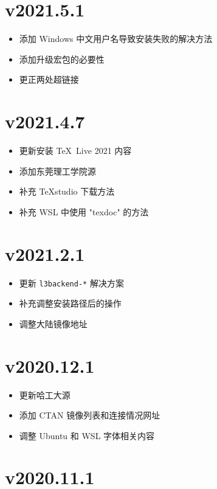 \section*{v2021.5.1}

\begin{itemize}
  \item 添加 Windows 中文用户名导致安装失败的解决方法
  \item 添加升级宏包的必要性
  \item 更正两处超链接
\end{itemize}

\section*{v2021.4.7}

\begin{itemize}
  \item 更新安装 \TeX~Live 2021 内容
  \item 添加东莞理工学院源
  \item 补充 \TeX studio 下载方法
  \item 补充 WSL 中使用 "texdoc" 的方法
\end{itemize}

\section*{v2021.2.1}

\begin{itemize}
  \item 更新 \texttt{l3backend-*} 解决方案
  \item 补充调整安装路径后的操作
  \item 调整大陆镜像地址
\end{itemize}
\section*{v2020.12.1}

\begin{itemize}
  \item 更新哈工大源
  \item 添加 CTAN 镜像列表和连接情况网址
  \item 调整 Ubuntu 和 WSL 字体相关内容
\end{itemize}

\section*{v2020.11.1}

